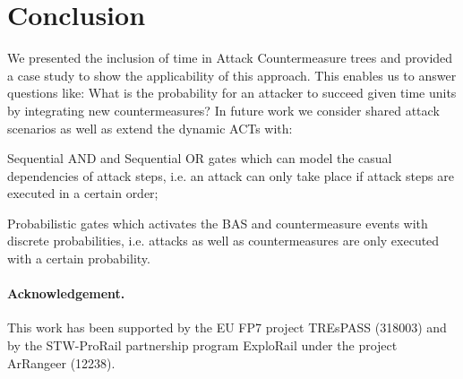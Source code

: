 \documentclass[submission,copyright,creativecommons]{eptcs}
\begin{document}
\section{Conclusion}
We presented the inclusion of time in Attack Countermeasure trees and provided a case study to show the applicability of this approach. This enables us to answer questions like: What is the probability for an attacker to succeed given  time units by integrating new countermeasures? In future work we consider shared attack scenarios as well as extend the dynamic ACTs with:
\begin{inparaenum}
\item Sequential AND and Sequential OR gates which can model the casual dependencies of attack steps, i.e. an attack can only take place if attack steps are executed in a certain order;
\item  Probabilistic gates which activates the BAS and countermeasure events with discrete probabilities, i.e. attacks as well as countermeasures are only executed with a certain probability.\end{inparaenum}

\paragraph{Acknowledgement.} This work has been supported by the EU FP7 project TREsPASS (318003) and by the STW-ProRail partnership program ExploRail under the project ArRangeer (12238). 



\end{document}
